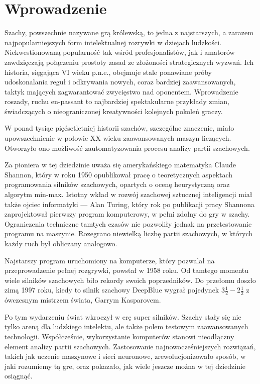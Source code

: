 \section{Wprowadzenie}
\label{sec:wprowadzenie}

Szachy, powszechnie nazywane grą królewską, to jedna z najstarszych, a zarazem najpopularniejszych form intelektualnej rozrywki w dziejach ludzkości.
Niekwestionowaną popularność tak wśród profesjonalistów, jak i amatorów zawdzięczają połączeniu prostoty zasad ze złożoności strategicznych wyzwań.
Ich historia, sięgająca VI wieku p.n.e., obejmuje stale ponawiane próby udoskonalania reguł i odkrywania nowych, coraz bardziej zaawansowanych, taktyk mających zagwarantować zwycięstwo nad oponentem.
Wprowadzenie roszady, ruchu en-passant to najbardziej spektakularne przykłady zmian, świadczących o nieograniczonej kreatywności kolejnych pokoleń graczy.


W ponad tysiąc pięćsetletniej historii szachów, szczególne znaczenie, miało upowszechnienie w połowie XX wieku zaawansowanych maszyn liczących.
Otworzyło ono możliwość zautomatyzowania procesu analizy partii szachowych.


Za pioniera w tej dziedzinie uważa się amerykańskiego matematyka Claude Shannon, który w roku 1950 opublikował pracę o teoretycznych aspektach programowania silników szachowych, opartych o ocenę heurystyczną oraz algorytm min-max.
Istotny wkład w rozwój szachowej sztucznej inteligencji miał także ojciec informatyki — Alan Turing, który rok po publikacji pracy Shannona zaprojektował pierwszy program komputerowy, w pełni zdolny do gry w szachy.
Ograniczenia techniczne tamtych czasów nie pozwoliły jednak na przetestowanie programu na maszynie.
Rozegrano niewielką liczbę partii szachowych, w których każdy ruch był obliczany analogowo.


Najstarszy program uruchomiony na komputerze, który pozwalał na przeprowadzenie pełnej rozgrywki, powstał w 1958 roku.
Od tamtego momentu wiele silników szachowych biło rekordy swoich poprzedników.
Do przełomu doszło zimą 1997 roku, kiedy to silnik szachowy DeepBlue wygrał pojedynek $3\frac{1}{2} - 2\frac{1}{2}$ z ówczesnym mistrzem świata, Garrym Kasparovem.


Po tym wydarzeniu świat wkroczył w erę super silników.
Szachy stały się nie tylko areną dla ludzkiego intelektu, ale także polem testowym zaawansowanych technologii.
Współcześnie, wykorzystanie komputerów stanowi nieodłączny element analizy partii szachowych.
Zastosowanie najnowocześniejszych rozwiązań, takich jak uczenie maszynowe i sieci neuronowe, zrewolucjonizowało sposób, w jaki rozumiemy tą gre, oraz pokazało, jak wiele jeszcze można w tej dziedzinie osiągnąć.

